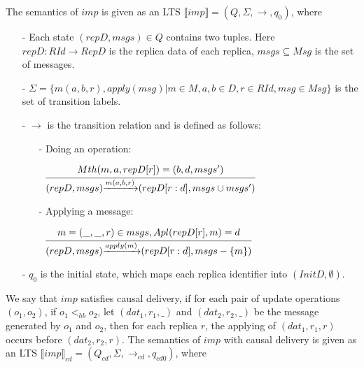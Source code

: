 The semantics of $imp$ is given as an LTS $\llbracket imp \rrbracket = (Q,\Sigma,\rightarrow,q_0)$, where

\begin{itemize}
\setlength{\itemsep}{0.5pt}
\item[-] Each state $(repD,msgs) \in Q$ contains two tuples. Here $repD: RId \rightarrow RepD$ is the replica data of each replica, $msgs \subseteq Msg$ is the set of messages. 

\item[-] $\Sigma = \{ m(a,b,r), apply(msg) \vert m \in M, a,b \in D, r \in RId, msg \in Msg \}$ is the set of transition labels. 

\item[-] $\rightarrow$ is the transition relation and is defined as follows: 

    \begin{itemize}
    \setlength{\itemsep}{0.5pt}
    \item[-] Doing an operation: 
    
    $\begin{array}{l c} \bigfrac{ Mth(m,a,repD[r]) = (b,d,msgs') } {(repD,msgs) {\xrightarrow{m(a,b,r)}} (repD[r:d],msgs \cup msgs')} \end{array}$
    
    \item[-] Applying a message: 

    $\begin{array}{l c} \bigfrac{ m = (\_,\_,r) \in msgs,Apl(repD[r],m) = d } {(repD,msgs) {\xrightarrow{apply(m)}} (repD[r:d],msgs - \{ m \} )} \end{array}$ 
    \end{itemize} 

\item[-] $q_0$ is the initial state, which maps each replica identifier into $(InitD,\emptyset)$. 
\end{itemize} 

We say that $imp$ satisfies causal delivery, if for each pair of update operations $(o_1,o_2)$, if $o_1 <_{hb} o_2$, let $(dat_1,r_1,\_)$ and $(dat_2,r_2,\_)$ be the message generated by $o_1$ and $o_2$, then for each replica $r$, the applying of $(dat_1,r_1,r)$ occurs before $(dat_2,r_2,r)$. The semantics of $imp$ with causal delivery is given as an LTS $\llbracket imp \rrbracket_{cd} = (Q_{cd},\Sigma,\rightarrow_{cd},q_{cd0})$, where

